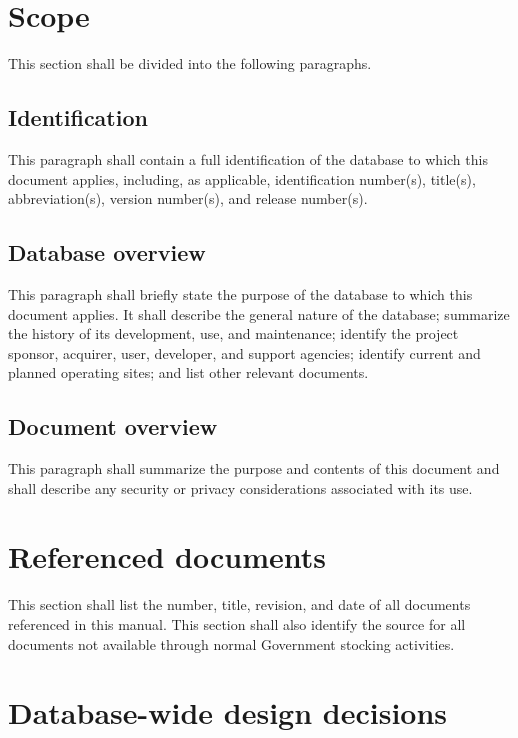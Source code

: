 \section{Scope}

This section shall be divided into the following paragraphs.

\subsection{Identification}

This paragraph shall contain a full identification of the database to
which this document applies, including, as applicable, identification
number(s), title(s), abbreviation(s), version number(s), and release
number(s).

\subsection{Database overview}

This paragraph shall briefly state the purpose of the database to which
this document applies. It shall describe the general nature of the
database; summarize the history of its development, use, and
maintenance; identify the project sponsor, acquirer, user, developer,
and support agencies; identify current and planned operating sites; and
list other relevant documents.

\subsection{Document overview}

This paragraph shall summarize the purpose and contents of this document
and shall describe any security or privacy considerations associated
with its use.

\section{Referenced documents}

This section shall list the number, title, revision, and date of all
documents referenced in this manual. This section shall also identify
the source for all documents not available through normal Government
stocking activities.

\section{Database-wide design decisions}

